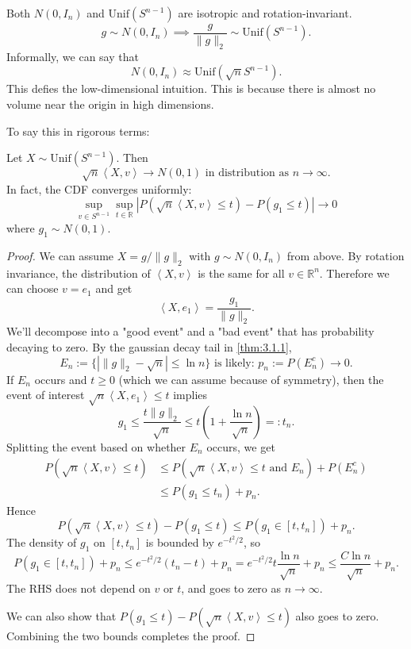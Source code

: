 \begin{note}
Both $N(0, I_n)$ and $\mathrm{Unif}(S^{n - 1})$ are isotropic and rotation-invariant. 
\[ g \sim N(0, I_n) \implies \frac{g}{\lVert g \rVert_{2}} \sim \mathrm{Unif}(S^{n - 1}). \]
Informally, we can say that 
\[ N(0, I_n) \approx \mathrm{Unif}(\sqrt{n}S^{n - 1}). \]
This defies the low-dimensional intuition. This is because there is almost no volume near the origin 
in high dimensions. 
\end{note}

To say this in rigorous terms: 
\begin{theorem}
\label{thm:3.3.9}
Let $X \sim \mathrm{Unif}(S^{n - 1})$. Then 
\[ \sqrt{n}\left\langle X, v \right\rangle \to N(0, 1) \text{ in distribution as } n \to \infty. \]
In fact, the CDF converges uniformly: 
\[ \sup_{v \in S^{n - 1}} \sup_{t \in \mathbb{R}} |P(\sqrt{n}\left\langle X, v \right\rangle \leq t) 
- P(g_1 \leq t)| \to 0 \]
where $g_1 \sim N(0, 1)$.
\end{theorem}

\begin{proof}
We can assume $X = g / \lVert g \rVert_{2}$ with $g \sim N(0, I_n)$ from above. By rotation invariance, 
the distribution of $\left\langle X, v \right\rangle$ is the same for all $v \in \mathbb{R}^n$. Therefore 
we can choose $v = e_1$ and get 
\[ \left\langle X, e_1 \right\rangle = \frac{g_1}{\lVert g \rVert_{2}}. \]
We'll decompose into a "good event" and a "bad event" that has probability decaying to zero. By the gaussian 
decay tail in \cref{thm:3.1.1},
\[ E_n := \{ |\lVert g \rVert_{2} - \sqrt{n}| \leq \ln{n} \} \text{ is likely: } 
p_n := P(E_n^c) \to 0. \]
If $E_n$ occurs and $t \geq 0$ (which we can assume because of symmetry), then the event of interest 
$\sqrt{n} \left\langle X, e_1 \right\rangle \leq t$ implies 
\[ g_1 \leq \frac{t \lVert g \rVert_{2}}{\sqrt{n}} \leq t \left( 1 + \frac{\ln{n}}{\sqrt{n}} \right) =: t_n. \]
Splitting the event based on whether $E_n$ occurs, we get 
\begin{align*}
	P(\sqrt{n}\left\langle X, v \right\rangle \leq t) 
	&\leq P (\sqrt{n}\left\langle X, v \right\rangle \leq t \text{ and } E_n) + P(E_n^c) \\
	&\leq P(g_1 \leq t_n) + p_n.
\end{align*}
Hence 
\[ P(\sqrt{n}\left\langle X, v \right\rangle \leq t) - P(g_1 \leq t) 
\leq P(g_1 \in [t, t_n]) + p_n. \]
The density of $g_1$ on $[t, t_n]$ is bounded by $e^{-t^2 / 2}$, so 
\[ P(g_1 \in [t, t_n]) + p_n \leq e^{-t^2 / 2}(t_n - t) + p_n 
= e^{-t^2 / 2}t \frac{\ln{n}}{\sqrt{n}} + p_n \leq \frac{C \ln{n}}{\sqrt{n}} + p_n. \]
The RHS does not depend on $v$ or $t$, and goes to zero as $n \to \infty$.

We can also show that $P(g_1 \leq t) - P(\sqrt{n}\left\langle X, v \right\rangle \leq t)$ also goes to 
zero. Combining the two bounds completes the proof.
\end{proof}

